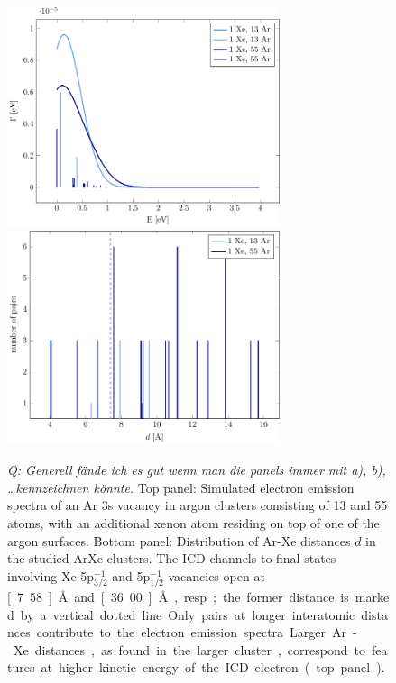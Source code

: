 \begin{figure}[H]
 \centering
 \includegraphics[width=8.0cm]{pics/surf.pdf}\\
 \includegraphics[width=8.0cm]{pics/R_comp.pdf}
 \caption{
 {\it Q: Generell f\"ande ich es gut wenn man die panels immer mit a), b), \dots kennzeichnen k\"onnte.}
 Top panel: Simulated electron emission spectra of an Ar 3s vacancy in 
          argon clusters
          consisting of 13 and 55 atoms, with an additional xenon atom residing
          on top of one of the argon surfaces.
          Bottom panel: Distribution of Ar-Xe distances $d$ in the studied ArXe
          clusters. The ICD channels to final states involving Xe 5p$_{3/2}^{-1}$ and 
          5p$_{1/2}^{-1}$ vacancies open at \unit[7.58]{\AA} and
          \unit[36.00]{\AA}, resp.; the former distance is marked by a vertical dotted line. 
          Only pairs at longer interatomic
          distances contribute to the electron emission spectra.
          Larger Ar-Xe distances, as found in the larger cluster,
          correspond to features at higher kinetic energy of
          the ICD electron (top panel).}
 \label{figure:surf}
\end{figure}


